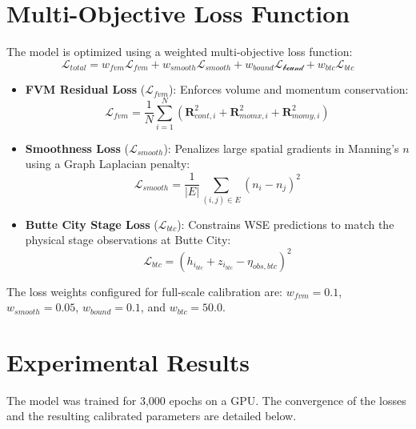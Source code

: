 \documentclass[11pt,a4paper]{article}
\begin{document}
\section{Multi-Objective Loss Function}
The model is optimized using a weighted multi-objective loss function:
\begin{equation}
\mathcal{L}_{total} = w_{fvm} \mathcal{L}_{fvm} + w_{smooth} \mathcal{L}_{smooth} + w_{bound} \mathcal{L_{bound}} + w_{btc} \mathcal{L}_{btc}
\end{equation}
\begin{itemize}
    \item \textbf{FVM Residual Loss} ($\mathcal{L}_{fvm}$): Enforces volume and momentum conservation:
    \begin{equation}
    \mathcal{L}_{fvm} = \frac{1}{N} \sum_{i=1}^N \left( \mathbf{R}_{cont, i}^2 + \mathbf{R}_{momx, i}^2 + \mathbf{R}_{momy, i}^2 \right)
    \end{equation}
    \item \textbf{Smoothness Loss} ($\mathcal{L}_{smooth}$): Penalizes large spatial gradients in Manning's $n$ using a Graph Laplacian penalty:
    \begin{equation}
    \mathcal{L}_{smooth} = \frac{1}{|E|} \sum_{(i,j) \in E} (n_i - n_j)^2
    \end{equation}
    \item \textbf{Butte City Stage Loss} ($\mathcal{L}_{btc}$): Constrains WSE predictions to match the physical stage observations at Butte City:
    \begin{equation}
    \mathcal{L}_{btc} = (h_{i_{btc}} + z_{i_{btc}} - \eta_{obs, btc})^2
    \end{equation}
\end{itemize}

The loss weights configured for full-scale calibration are: $w_{fvm} = 0.1$, $w_{smooth} = 0.05$, $w_{bound} = 0.1$, and $w_{btc} = 50.0$.

\section{Experimental Results}
The model was trained for 3,000 epochs on a GPU. The convergence of the losses and the resulting calibrated parameters are detailed below.
\end{document}
